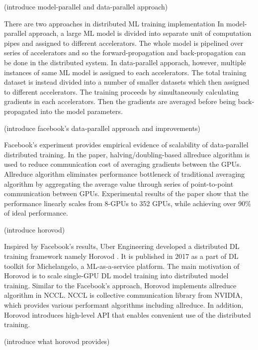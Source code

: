 (introduce model-parallel and data-parallel approach\cite{approaches2019Mao})

There are two approaches in distributed ML training implementation
In model-parallel approach, a large ML model is divided into separate unit
of computation pipes and assigned to different accelerators. The whole model
is pipelined over series of accelerators and so the forward-propagation and
back-propagation can be done in the distributed system.
In data-parallel apporach, however, multiple instances of same ML model
is assigned to each accelerators. The total training dataset is instead
divided into a number of smaller datasets which then assigned to different
accelerators. The training proceeds by simultaneously calculating gradients
in each accelerators. Then the gradients are averaged before being 
back-propagated into the model parameters.

(introduce facebook's data-parallel approach and improvements)

Facebook's experiment \cite{facebook2018} provides empirical evidence of
scalability of data-parallel distributed training. In the paper, 
halving/doubling-based allreduce algorithm is used to reduce communication cost 
of averaging gradients between the GPUs. 
Allreduce algorithm eliminates performance bottleneck of traditional
averaging algorithm by aggregating the average value through series of
point-to-point communication between GPUs. 
Experimental results of the paper show that the performance linearly
scales from 8-GPUs to 352 GPUs, while achieving over 90\% of ideal performance.

(introduce horovod)

Inspired by Facebook's results, Uber Engineering developed a distributed DL
training framework namely Horovod \cite{sergeev2018horovod}. It is published in
2017 as a part of DL toolkit for Michelangelo, a ML-as-a-service platform.
The main motivation of Horovod is to scale single-GPU DL model training
into distributed model training. Similar to the Facebook's approach,
Horovod implements allreduce algorithm in NCCL. NCCL is collective communication
library from NVIDIA, which provides various performant algorithms including
allreduce. In addition, Horovod introduces high-level API that enables
convenient use of the distributed training.  

(introduce what horovod provides)
